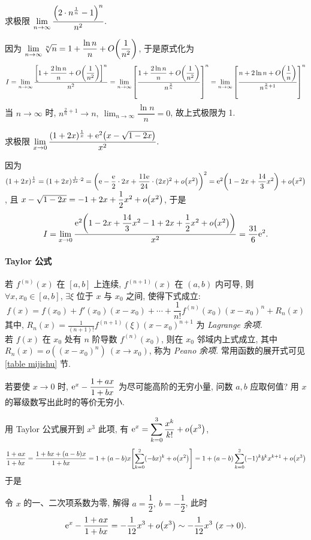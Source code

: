 \begin{example}
    求极限 $\displaystyle\lim_{n\to\infty}\dfrac{\qty(2\cdot n^{\frac{1}{n}}-1)^n}{n^2}.$
\end{example}
\begin{solution}
    因为 $\displaystyle \lim_{n\to\infty}\sqrt[n]{n}=1+\dfrac{\ln n}{n}+O\qty(\dfrac{1}{n^2})$, 于是原式化为
    $$I=\lim_{n\to\infty}\dfrac{\qty[1+\dfrac{2\ln n}{n}+O\qty(\dfrac{1}{n^2})]^n}{n^2}=\lim_{n\to\infty}\qty[\dfrac{1+\dfrac{2\ln n}{n}+O\qty(\dfrac{1}{n^2})}{n^{\frac{2}{n}}}]^n=\lim_{n\to\infty}\qty[\dfrac{n+2\ln n+O\qty(\dfrac{1}{n})}{n^{\frac{2}{n}+1}}]^n$$
    当 $n\to\infty$ 时, $n^{\frac{2}{n}+1}\to n,~\displaystyle\lim_{n\to\infty}\dfrac{\ln n}{n}=0$, 故上式极限为 1.
\end{solution}

\begin{example}
    求极限 $\displaystyle \lim_{x\to0}\dfrac{(1+2x)^{\frac{1}{x}}+\mathrm{e}^{2}\qty(x-\sqrt{1-2x})}{x^2}.$
\end{example}
\begin{solution}
    因为 $(1+2x)^{\frac{1}{x}}=(1+2x)^{\frac{1}{2x}\cdot 2}=\qty(\mathrm{e}-\dfrac{\mathrm{e}}{2}\cdot2x+\dfrac{11\mathrm{e}}{24}\cdot(2x)^2+o\qty(x^2))^2=\mathrm{e}^2\qty(1-2x+\dfrac{14}{3}x^2)+o\qty(x^2)$, 且 $x-\sqrt{1-2x}=-1+2x+\dfrac{1}{2}x^2+o\qty(x^2)$, 于是
    $$I=\lim_{x\to0}\dfrac{\mathrm{e}^2\qty(1-2x+\dfrac{14}{3}x^2-1+2x+\dfrac{1}{2}x^2+o\qty(x^2))}{x^2}=\dfrac{31}{6}\mathrm{e}^2.$$
\end{solution}

\paragraph{Taylor 公式}
若 $f^{(n)}(x)$ 在 $[a,b]$ 上连续, $f^{(n+1)}(x)$ 在 $(a,b)$ 内可导, 则 $\forall x,x_0\in[a,b]$, $\exists \xi$ 位于 $x$ 与 $x_0$ 之间, 使得下式成立:
$$f(x)=f(x_0)+f'(x_0)(x-x_0)+\cdots+\frac{1}{n!}f^{(n)}(x_0)(x-x_0)^n+R_n(x)$$
其中, $\displaystyle R_n(x)=\frac{1}{(n+1)!}f^{(n+1)}(\xi)(x-x_0)^{n+1}$ 为 \textit{Lagrange 余项}.\\
若 $f(x)$ 在 $x_0$ 处有 $n$ 阶导数 $f^{(n)}(x_0)$, 则在 $x_0$ 邻域内上式成立,
其中 $R_n(x)=o((x-x_0)^n)~ (x\to x_0)$, 称为 \textit{Peano 余项}. 常用函数的展开式可见 \ref{table mijishu} 节.

\begin{example}
    若要使 $x\to0$ 时, $\mathrm{e}^x-\dfrac{1+ax}{1+bx}$ 为尽可能高阶的无穷小量, 问数 $a,b$ 应取何值? 用 $x$ 的幂级数写出此时的等价无穷小.
\end{example}
\begin{solution}
    用 Taylor 公式展开到 $x^3$ 此项, 有 $\displaystyle\mathrm{e}^x=\sum_{k=0}^{3}\dfrac{x^k}{k!}+o\qty(x^3)$,
    $$\dfrac{1+ax}{1+bx}=\dfrac{1+bx+(a-b)x}{1+bx}=1+(a-b)x\qty[\sum_{k=0}^{2}(-bx)^k+o\qty(x^2)]=1+(a-b)\sum_{k=0}^{2}(-1)^kb^kx^{k+1}+o\qty(x^3)$$
    于是
    令 $x$ 的一、二次项系数为零, 解得 $a=\dfrac{1}{2},~b=-\dfrac{1}{2}$, 此时 $$\mathrm{e}^x-\dfrac{1+ax}{1+bx}=-\dfrac{1}{12}x^3+o\qty(x^3)\sim-\dfrac{1}{12}x^3~ (x\to0).$$
\end{solution}

